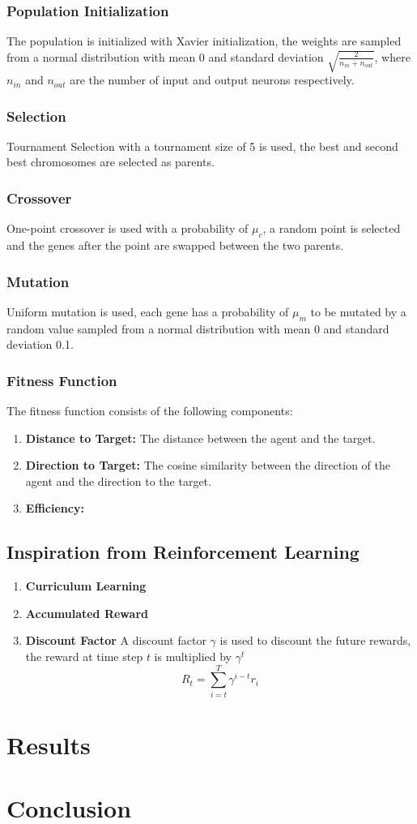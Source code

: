 \documentclass[sigconf]{acmart}
\begin{document}
\subsubsection{Population Initialization} The population is initialized with Xavier initialization, the weights are sampled from a normal distribution with mean 0 and standard deviation $\sqrt{\frac{2}{n_{in} + n_{out}}}$, where $n_{in}$ and $n_{out}$ are the number of input and output neurons respectively.
\subsubsection{Selection} Tournament Selection with a tournament size of 5 is used, the best and second best chromosomes are selected as parents.
\subsubsection{Crossover} One-point crossover is used with a probability of $\mu_c$, a random point is selected and the genes after the point are swapped between the two parents.
\subsubsection{Mutation} Uniform mutation is used, each gene has a probability of $\mu_m$ to be mutated by a random value sampled from a normal distribution with mean 0 and standard deviation 0.1.
\subsubsection{Fitness Function}
The fitness function consists of the following components:
\begin{enumerate}
  \item \textbf{Distance to Target:} The distance between the agent and the target.
  \item \textbf{Direction to Target:} The cosine similarity between the direction of the agent and the direction to the target.
  \item \textbf{Efficiency:} 
\end{enumerate}
\subsection{Inspiration from Reinforcement Learning}
\begin{enumerate}
  \item \textbf{Curriculum Learning}
  \item \textbf{Accumulated Reward}
  \item \textbf{Discount Factor} A discount factor $\gamma$ is used to discount the future rewards, the reward at time step $t$ is multiplied by $\gamma^t$
  \begin{equation}
    R_t = \sum_{i=t}^{T} \gamma^{i-t} r_i
    \label{eq:discount}
  \end{equation}
\end{enumerate}


\section{Results}

\section{Conclusion}



\end{document}
